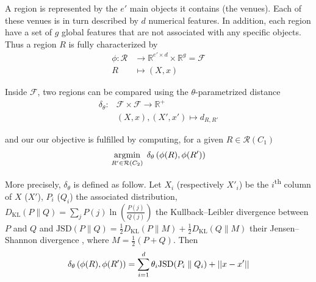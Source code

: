 

A region is represented by the $e'$ main objects it contains (the venues).
Each of these venues is in turn described by $d$ numerical features. In
addition, each region have a set of $g$ global features that are not
associated with any specific objects. Thus a region $R$ is fully characterized
by
\begin{align*}
	\phi \colon \mathcal{R} &\to
	\mathbb{R}^{e'\times d} \times \mathbb{R}^g = \mathcal{F} \\
	R &\mapsto (X, x)
\end{align*}

Inside $\mathcal{F}$, two regions can be compared using the
$\theta$-parametrized distance
\begin{align*}
	\delta_{\theta} \colon &\mathcal{F} \times \mathcal{F} \to
	\mathbb{R}^+ \\
	&(X, x) , (X', x') \mapsto d_{R,R'}
\end{align*}

and our our objective is fulfilled by computing, for a given $R \in
\mathcal{R}(C_1)$
\begin{equation}
	\operatorname*{argmin}_{R' \in \mathcal{R}(C_2)}\; \delta_{\theta}
	\left(\phi(R), \phi(R')\right)
	\label{e:onetheta}
\end{equation}

More precisely, $\delta_{\theta}$ is defined as follow. Let $X_i$ (respectively
$X'_i$) be the $i$\textsuperscript{th} column of $X$ ($X'$), $P_i$ ($Q_i$) the
associated distribution, $D_{\mathrm{KL}}(P \parallel Q) = \sum_j
P(j)\ln\left(\frac{P(j)}{Q(j)}\right)$ the Kullback--Leibler divergence
between $P$ and $Q$ and $ \mathrm{JSD}(P \parallel Q)=
\frac{1}{2}D_{\mathrm{KL}}(P \parallel M)+\frac{1}{2}D_{\mathrm{KL}}(Q
\parallel M)$ their Jensen--Shannon divergence \autocite{JensenShannon03},
where $M=\frac{1}{2}(P+Q)$. Then
\[
	\delta_{\theta} \left(\phi(R), \phi(R')\right) = \sum_{i=1}^d
	\theta_i \mathrm{JSD}(P_i \parallel Q_i) + \left|\left|x - x'\right|\right|
\]

